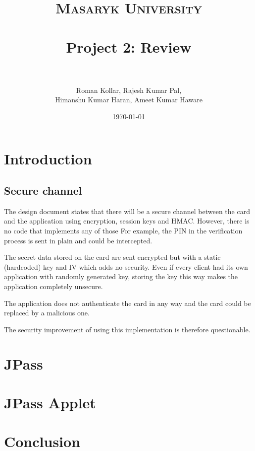 \documentclass[paper=a4, fontsize=12pt]{scrartcl}
\title{
\normalfont \normalsize
\textsc{Masaryk University} \\ [25pt]
\horrule{0.5pt} \\[0.4cm]
\huge Project 2: Review  \\
\horrule{2pt} \\[0.5cm]
}
\author{Roman Kollar, Rajesh Kumar Pal,\\Himanshu Kumar Haran, Ameet Kumar Haware}
\date{\normalsize\today}
\begin{document}
\maketitle

\section{Introduction}
\subsection{Secure channel}
The design document states that there will be a secure channel between the card and the application using encryption, session keys and HMAC.
However, there is no code that implements any of those
For example, the PIN in the verification process is sent in plain and could be intercepted.

The secret data stored on the card are sent encrypted but with a static (hardcoded) key and IV which adds no security.
Even if every client had its own application with randomly generated key, storing the key this way makes the application completely unsecure.

The application does not authenticate the card in any way and the card could be replaced by a malicious one.

The security improvement of using this implementation is therefore questionable.

\section{JPass}

\section{JPass Applet}

\section{Conclusion}
\end{document}
